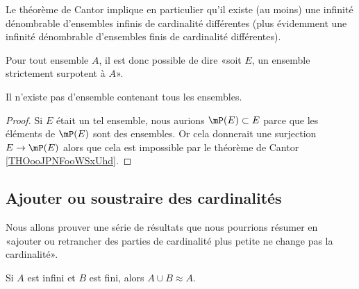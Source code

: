 \begin{normaltext}
	Le théorème de Cantor implique en particulier qu'il existe (au moins) une infinité dénombrable d'ensembles infinis de cardinalité différentes (plus évidemment une infinité dénombrable d'ensembles finis de cardinalité différentes).

	Pour tout ensemble \( A\), il est donc possible de dire «soit \( E\), un ensemble strictement surpotent à \( A\)».
\end{normaltext}

\begin{corollary}       \label{CORooZMAOooPfJosM}
	Il n'existe pas d'ensemble contenant tous les ensembles.
\end{corollary}

\begin{proof}
	Si \( E\) était un tel ensemble, nous aurions \( \mP(E)\subset E\) parce que les éléments de \( \mP(E)\) sont des ensembles. Or cela donnerait une surjection \( E\to \mP(E)\) alors que cela est impossible par le théorème de Cantor \ref{THOooJPNFooWSxUhd}.
\end{proof}

\subsection{Ajouter ou soustraire des cardinalités}

Nous allons prouver une série de résultats que nous pourrions résumer en  «ajouter ou retrancher des parties de cardinalité plus petite ne change pas la cardinalité».

\begin{lemma}        \label{LEMooUFCAooSyZtZj}
	Si \( A\) est infini et \( B\) est fini, alors \( A\cup B\approx A\).
\end{lemma}

